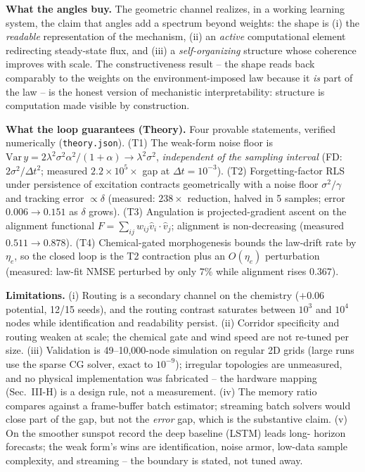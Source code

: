 \documentclass[conference]{IEEEtran}
\begin{document}
\textbf{What the angles buy.} The geometric channel realizes, in a working learning
system, the claim that angles add a spectrum beyond weights: the shape is (i) the
\emph{readable} representation of the mechanism, (ii) an \emph{active} computational
element redirecting steady-state flux, and (iii) a \emph{self-organizing} structure
whose coherence improves with scale. The constructiveness result -- the shape reads
back comparably to the weights on the environment-imposed law because it \emph{is}
part of the law -- is the honest version of mechanistic interpretability: structure is
computation made visible by construction.

\textbf{What the loop guarantees (Theory).} Four provable statements, verified
numerically (\texttt{theory.json}). (T1) The weak-form noise floor is
$\mathrm{Var}\,y = 2\lambda^2\sigma^2\alpha^2/(1+\alpha) \to \lambda^2\sigma^2$,
\emph{independent of the sampling interval} (FD: $2\sigma^2/\Delta t^2$; measured
$2.2{\times}10^{5}\times$ gap at $\Delta t{=}10^{-3}$). (T2) Forgetting-factor RLS
under persistence of excitation contracts geometrically with a noise floor
$\sigma^2/\gamma$ and tracking error $\propto \delta$ (measured: $238\times$
reduction, halved in 5 samples; error $0.006 \to 0.151$ as $\delta$ grows). (T3)
Angulation is projected-gradient ascent on the alignment functional $F =
\sum_{ij}w_{ij}\hat v_i{\cdot}\hat v_j$; alignment is non-decreasing (measured
$0.511 \to 0.878$). (T4) Chemical-gated morphogenesis bounds the law-drift rate by
$\eta_e$, so the closed loop is the T2 contraction plus an $O(\eta_e)$ perturbation
(measured: law-fit NMSE perturbed by only $7\%$ while alignment rises $0.367$).

\textbf{Limitations.} (i) Routing is a secondary channel on the chemistry ($+0.06$
potential, 12/15 seeds), and the routing contrast saturates between $10^3$ and
$10^4$ nodes while identification and readability persist. (ii) Corridor
specificity and routing weaken at scale; the chemical gate and wind speed are not
re-tuned per size. (iii) Validation is 49--10,000-node simulation on regular 2D
grids (large runs use the sparse CG solver, exact to $10^{-9}$); irregular
topologies are unmeasured, and no physical implementation was fabricated -- the
hardware mapping (Sec.~III-H) is a design rule, not a measurement. (iv) The memory
ratio compares against a frame-buffer batch estimator; streaming batch solvers
would close part of the gap, but not the \emph{error} gap, which is the substantive
claim. (v) On the smoother sunspot record the deep baseline (LSTM) leads long-
horizon forecasts; the weak form's wins are identification, noise armor, low-data
sample complexity, and streaming -- the boundary is stated, not tuned away.
\end{document}
